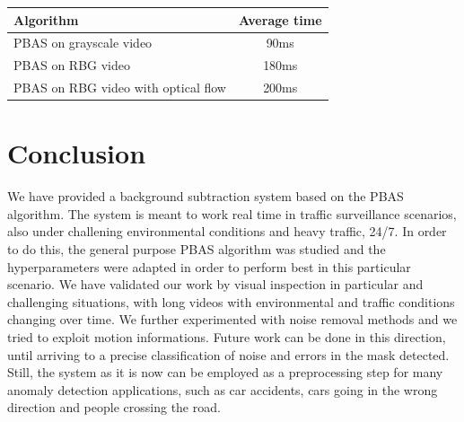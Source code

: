\begin{table}[]
\begin{tabular}{l|c}
    Algorithm                                     & Average time \\
    \hline
    PBAS on grayscale video                       & 90ms         \\
    PBAS on RBG video                             & 180ms        \\
    PBAS on RBG video with optical flow   & 200ms        
\end{tabular}
\end{table}

\section*{Conclusion}
We have provided a background subtraction system based on the PBAS algorithm. The system is meant to work real time in traffic surveillance scenarios, also under challening environmental conditions and heavy traffic, 24/7. In order to do this, the general purpose PBAS algorithm was studied and the hyperparameters were adapted in order to perform best in this particular scenario. We have validated our work by visual inspection in particular and challenging situations, with long videos with environmental and traffic conditions changing over time. We further experimented with noise removal methods and we tried to exploit motion informations. Future work can be done in this direction, until arriving to a precise classification of noise and errors in the mask detected. Still, the system as it is now can be employed as a preprocessing step for many anomaly detection applications, such as car accidents, cars going in the wrong direction and people crossing the road.